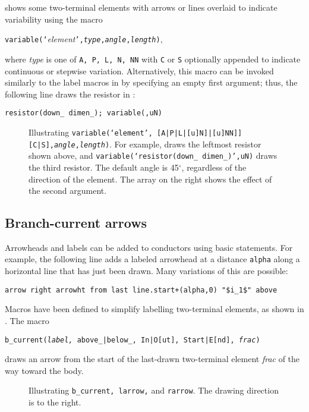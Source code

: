  shows some two-terminal elements with
arrows or lines overlaid to indicate variability using the macro
\par
{\tt variable(`}{\sl element}{\tt',{\sl type},{\sl angle},{\sl length})},

\noindent
where {\sl type} is one of {\tt A, P, L, N, NN} with {\tt C} or {\tt S}
optionally appended to indicate continuous or stepwise variation.
Alternatively, this macro
can be invoked similarly to the label macros in
 by specifying an empty first argument;
thus, the following line draws the resistor in :
\par
   {\tt resistor(down\_ dimen\_); variable(,uN)}

\begin{figure}[ht]
\vspace*{-\baselineskip}
   
   \caption{Illustrating
{\tt variable(`{\sl element}',%
[A|P|L|[u]N]|[u]NN]][C|S],{\sl angle},{\sl length})}.
   For example, draws
   the leftmost resistor shown above, and {\tt variable(`resistor(down\_
   dimen\_)',uN)} draws the third resistor.  The default angle is
   45${}^{\circ}$, regardless of the direction of the element.  The array
   on the right shows the effect of the second argument.}
   \label{Variable}
   \end{figure}

\subsection{Branch-current arrows\label{Branchcurrent:}}
Arrowheads and labels can be added to conductors using basic
\pic statements.  For example, the following line adds a labeled
arrowhead at a distance {\tt alpha} along a horizontal line that has
just been drawn.  Many variations of this are possible:

  \verb|arrow right arrowht from last line.start+(alpha,0) "$i_1$" above|

Macros have been defined to simplify labelling two-terminal
elements, as shown in .
The macro

   {\tt b\_current({\sl label,} above\_|below\_, In|O[ut], Start|E[nd],
   {\sl frac})}

\noindent
draws an arrow from the start of the last-drawn two-terminal element
{\sl frac} of the way toward the body.
\begin{figure}[ht]
   
   \caption{Illustrating {\tt b\_current, larrow,} and {\tt rarrow}.
      The drawing direction is to the right.}
   \label{currents}
   \end{figure}

